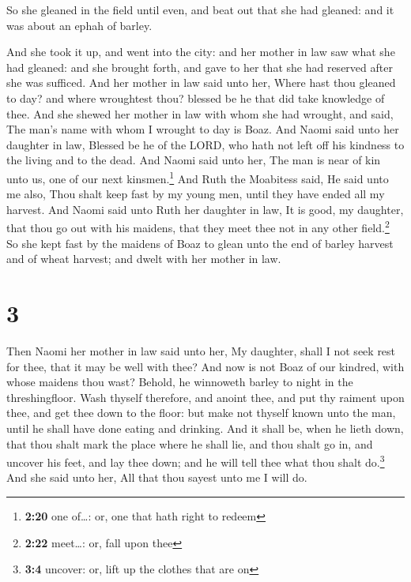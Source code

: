  So she gleaned in the field until even, and beat out
that she had gleaned: and it was about an ephah of barley.

 And she took it up, and went into the city: and her
mother in law saw what she had gleaned: and she brought forth, and gave
to her that she had reserved after she was sufficed.  And
her mother in law said unto her, Where hast thou gleaned to day? and
where wroughtest thou? blessed be he that did take knowledge of thee.
And she shewed her mother in law with whom she had wrought, and said,
The man's name with whom I wrought to day is Boaz.  And
Naomi said unto her daughter in law, Blessed be he of the LORD, who hath
not left off his kindness to the living and to the dead. And Naomi said
unto her, The man is near of kin unto us, one of our next
kinsmen.\footnote{\textbf{2:20} one of\ldots: or, one that hath right to
  redeem}  And Ruth the Moabitess said, He said unto me
also, Thou shalt keep fast by my young men, until they have ended all my
harvest.  And Naomi said unto Ruth her daughter in law,
It is good, my daughter, that thou go out with his maidens, that they
meet thee not in any other field.\footnote{\textbf{2:22} meet\ldots: or,
  fall upon thee}  So she kept fast by the maidens of
Boaz to glean unto the end of barley harvest and of wheat harvest; and
dwelt with her mother in law.

\hypertarget{section-2}{%
\section{3}\label{section-2}}

 Then Naomi her mother in law said unto her, My daughter,
shall I not seek rest for thee, that it may be well with thee?
 And now is not Boaz of our kindred, with whose maidens
thou wast? Behold, he winnoweth barley to night in the threshingfloor.
 Wash thyself therefore, and anoint thee, and put thy
raiment upon thee, and get thee down to the floor: but make not thyself
known unto the man, until he shall have done eating and drinking.
 And it shall be, when he lieth down, that thou shalt mark
the place where he shall lie, and thou shalt go in, and uncover his
feet, and lay thee down; and he will tell thee what thou shalt
do.\footnote{\textbf{3:4} uncover: or, lift up the clothes that are on}
 And she said unto her, All that thou sayest unto me I
will do.

